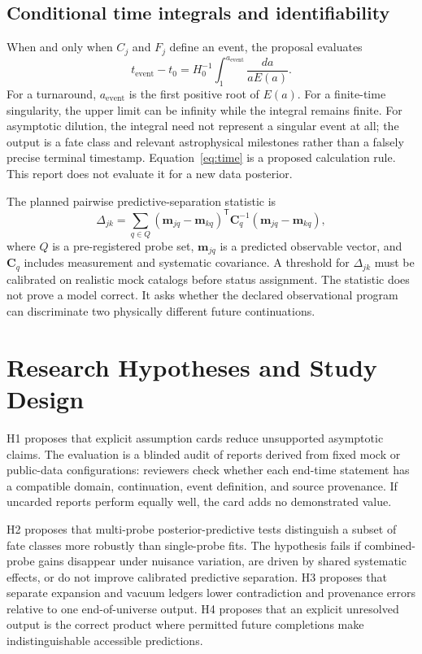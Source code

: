 \documentclass[conference]{IEEEtran}
\begin{document}
\subsection{Conditional time integrals and identifiability}

When and only when \(C_j\) and \(F_j\) define an event, the proposal evaluates
\begin{equation}
 t_{\mathrm{event}}-t_0 =
 H_0^{-1}\int_{1}^{a_{\mathrm{event}}}
 \frac{da}{aE(a)}.
\label{eq:time}
\end{equation}
For a turnaround, \(a_{\mathrm{event}}\) is the first positive root of \(E(a)\). For a finite-time singularity, the upper limit can be infinity while the integral remains finite. For asymptotic dilution, the integral need not represent a singular event at all; the output is a fate class and relevant astrophysical milestones rather than a falsely precise terminal timestamp. Equation~\eqref{eq:time} is a proposed calculation rule. This report does not evaluate it for a new data posterior.

The planned pairwise predictive-separation statistic is
\begin{equation}
 \Delta_{jk}=\sum_{q\in Q}
 \left(\mathbf{m}_{jq}-\mathbf{m}_{kq}\right)^{\mathsf T}
 \mathbf{C}_{q}^{-1}
 \left(\mathbf{m}_{jq}-\mathbf{m}_{kq}\right),
\label{eq:divergence}
\end{equation}
where \(Q\) is a pre-registered probe set, \(\mathbf{m}_{jq}\) is a predicted observable vector, and \(\mathbf{C}_q\) includes measurement and systematic covariance. A threshold for \(\Delta_{jk}\) must be calibrated on realistic mock catalogs before status assignment. The statistic does not prove a model correct. It asks whether the declared observational program can discriminate two physically different future continuations.

\section{Research Hypotheses and Study Design}

H1 proposes that explicit assumption cards reduce unsupported asymptotic claims. The evaluation is a blinded audit of reports derived from fixed mock or public-data configurations: reviewers check whether each end-time statement has a compatible domain, continuation, event definition, and source provenance. If uncarded reports perform equally well, the card adds no demonstrated value.

H2 proposes that multi-probe posterior-predictive tests distinguish a subset of fate classes more robustly than single-probe fits. The hypothesis fails if combined-probe gains disappear under nuisance variation, are driven by shared systematic effects, or do not improve calibrated predictive separation. H3 proposes that separate expansion and vacuum ledgers lower contradiction and provenance errors relative to one end-of-universe output. H4 proposes that an explicit unresolved output is the correct product where permitted future completions make indistinguishable accessible predictions.
\end{document}

